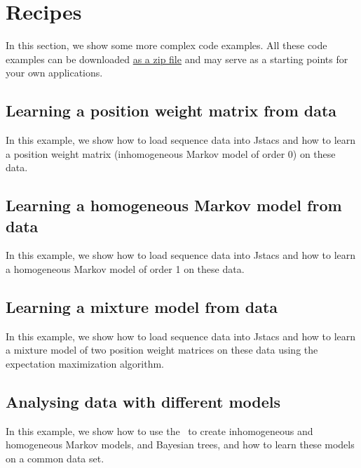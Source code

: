\section{Recipes}\label{recipes}


In this section, we show some more complex code examples. All these code examples can be downloaded \href{http://www.jstacs.de/downloads/recipes.zip}{as a zip file} and may serve as a starting points for your own applications.

\subsection{Learning a position weight matrix from data}
In this example, we show how to load sequence data into Jstacs and how to learn a position weight matrix (inhomogeneous Markov model of order 0) on these data.
\renewcommand{\codefile}{./recipes/TrainPWM.java}
\setcounter{off}{36}

\subsection{Learning a homogeneous Markov model from data}
In this example, we show how to load sequence data into Jstacs and how to learn a homogeneous Markov model of order 1 on these data.
\renewcommand{\codefile}{./recipes/TrainHomogeneousMM.java}
\setcounter{off}{35}

\subsection{Learning a mixture model from data}
In this example, we show how to load sequence data into Jstacs and how to learn a mixture model of two position weight matrices on these data using the expectation maximization algorithm.
\renewcommand{\codefile}{./recipes/CreateMixtureModel.java}
\setcounter{off}{35}

\subsection{Analysing data with different models}
In this example, we show how to use the \TrainSMFactory~to create inhomogeneous and homogeneous Markov models, and Bayesian trees, and how to learn these models on a common data set.
\renewcommand{\codefile}{./recipes/AnalyseDataWithDifferentModels.java}
\setcounter{off}{35}


